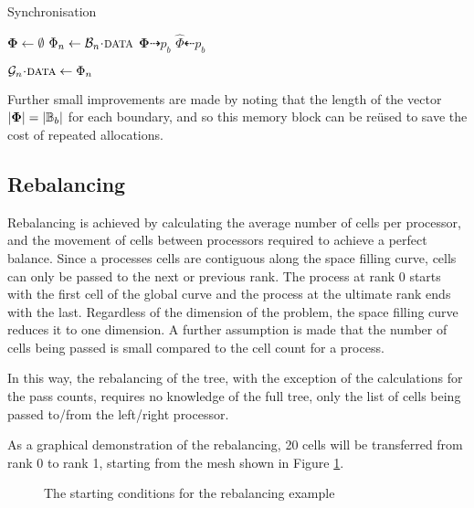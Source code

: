 \documentclass{IIBproject}
\newcommand{\vect}[1]{\bm{#1}}
\newcommand{\dra}{\dashrightarrow}
\newcommand{\dla}{\dashleftarrow}
\newcommand{\acc}{{\mkern 0.5mu\cdot\mkern 0.5mu}}
\begin{document}
\begin{algorithm}[H]
\caption{Synchronisation}
\label{alg:sync-sendrecv}

\begin{algorithmic}
	\State $\vect{\Phi} \gets \emptyset$
		\State $\Phi_n \gets \mathcal{B}_n\acc\textproc{data}$
	\EndFor
	\Send $\vect{\Phi} \dra p_b$
\EndFor
\Statex
{}
	\Recv $\hat \Phi \dla p_b$

		\State $\mathcal{G}_n\acc\textproc{data} \gets \Phi_n$
	\EndFor
\EndFor
\end{algorithmic}
\end{algorithm}

Further small improvements are made by noting that the length of the vector $\abs{\vect{\Phi}} = \abs{\mathbb{B}_b}$ for each boundary, and so this memory block can be re\"used to save the cost of repeated allocations. 


\subsection{Rebalancing}

Rebalancing is achieved by calculating the average number of cells per processor, and the movement of cells between processors required to achieve a perfect balance. Since a processes cells are contiguous along the space filling curve, cells can only be passed to the next or previous rank. The process at rank 0 starts with the first cell of the global curve and the process at the ultimate rank ends with the last. Regardless of the dimension of the problem, the space filling curve reduces it to one dimension. A further assumption is made that the number of cells being passed is small compared to the cell count for a process. 

In this way, the rebalancing of the tree, with the exception of the calculations for the pass counts, requires no knowledge of the full tree, only the list of cells being passed to/from the left/right processor. 

As a graphical demonstration of the rebalancing, 20 cells will be transferred from rank 0 to rank 1, starting from the mesh shown in Figure \ref{fig:rebalance-init}.

\begin{figure}[H]
	\caption{The starting conditions for the rebalancing example}
	\label{fig:rebalance-init}
	
\end{figure}
\end{document}
